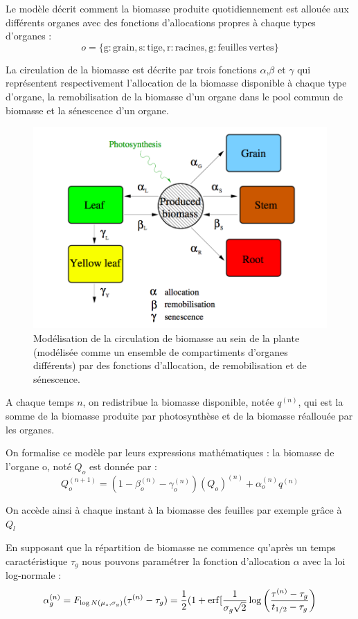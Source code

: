 Le modèle décrit comment la biomasse produite quotidiennement est allouée aux différents organes avec des fonctions d'allocations propres à chaque types d'organes :
\[ o = \{\mathrm{g:grain, s:tige, r:racines, g : feuilles~vertes}\} \]

La circulation de la biomasse est décrite par trois fonctions $\alpha$,$\beta$ et $\gamma$ qui représentent respectivement l'allocation de la biomasse disponible à chaque type d'organe, la remobilisation de la biomasse d'un organe dans le pool commun de biomasse et la sénescence d'un organe.

\begin{figure}[h]
\centering
  \includegraphics[scale=0.37]{./img/schema-lnas.png}
  \caption{Modélisation de la circulation de biomasse au sein de la plante (modélisée comme un ensemble de compartiments d'organes différents) par des fonctions d'allocation, de remobilisation et de sénescence.}
  \label{fig:circulation_biomasse}
\end{figure}



A chaque temps $n$, on redistribue la biomasse disponible, notée $q^{(n)}$, qui est la somme de la biomasse produite par photosynthèse et de la biomasse réallouée par les organes.

On formalise ce modèle par leurs expressions mathématiques : 
la biomasse de l'organe o, noté $Q_o$ est donnée par :
\[ {Q_o^{(n+1)}} = (1-\beta_o^{(n)}-\gamma_o^{(n)} )(Q_o)^{(n)} +\alpha_o^{(n)}q^{(n)} \]

On accède ainsi à chaque instant à la biomasse des feuilles par exemple grâce à $Q_l$

En supposant que la répartition de biomasse ne commence qu'après un temps caractéristique $\tau_g$ nous pouvons paramétrer la fonction d'allocation $\alpha$ avec la loi log-normale :
\[ {\alpha_g^{(n)}}=F_{\log N(\mu_s,\sigma_g)}(\tau^{(n)}-\tau_g)=\frac{1}{2} (1+\operatorname{erf}[\frac{1}{\sigma_g \sqrt{2}}\log\left(\frac{\tau^{(n)}-\tau_g}{t_{1/2}-\tau_g}\right) \]

